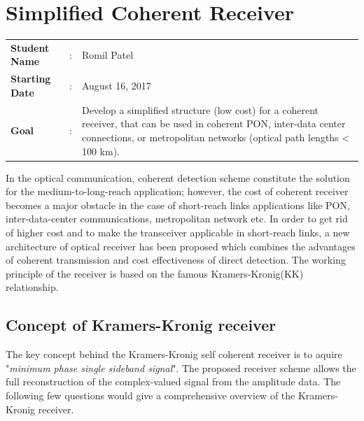 \clearpage
\section{Simplified Coherent Receiver}

\begin{tcolorbox}	
\begin{tabular}{p{2.75cm} p{0.2cm} p{10.5cm}} 	
\textbf{Student Name}  &:& Romil Patel\\
\textbf{Starting Date} &:& August 16, 2017\\
\textbf{Goal}          &:& Develop a simplified structure (low cost) for a coherent receiver, that can be used in coherent PON, inter-data center connections, or metropolitan networks (optical path lengths < 100 km).
\end{tabular}
\end{tcolorbox}

In the optical communication, coherent detection scheme constitute the solution for the medium-to-long-reach application; however, the cost of coherent receiver becomes a major obstacle in the case of short-reach links applications like PON, inter-data-center communications, metropolitan network etc. In order to get rid of higher cost and to make the transceiver applicable in short-reach links, a new architecture of optical receiver has been proposed which combines the advantages of coherent transmission and cost effectiveness of direct detection. The working principle of the receiver is based on the famous Kramers-Kronig(KK) relationship. 
\subsection{Concept of Kramers-Kronig receiver }
The key concept behind the Kramers-Kronig self coherent receiver is to aquire "\textit{minimum phase single sideband signal}". The proposed receiver scheme allows the full reconstruction of the complex-valued signal from the amplitude data. The following few questions would give a comprehensive overview of the Kramers-Kronig receiver.

